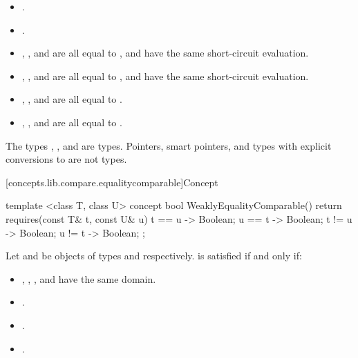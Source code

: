 \begin{itemize}
\item {}.
\item {}.
\item {}, , and
       are all equal to
      , and have the same short-circuit evaluation.
\item {}, , and
       are all equal to
      , and have the same short-circuit evaluation.
\item {}, , and
       are all equal to .
\item {}, , and
       are all equal to .
\end{itemize}

\pnum \enterexample The types , , and
 are  types.
Pointers, smart pointers, and types with explicit conversions to  are
not  types.\exitexample

[concepts.lib.compare.equalitycomparable]{Concept }

%
\begin{itemdecl}
template <class T, class U>
concept bool WeaklyEqualityComparable() {
  return requires(const T& t, const U& u) {
    { t == u } -> Boolean;
    { u == t } -> Boolean;
    { t != u } -> Boolean;
    { u != t } -> Boolean;
  };
}
\end{itemdecl}

\begin{itemdescr}
\pnum
Let  and  be objects of types  and  respectively.
 is satisfied if and only if:
\begin{itemize}
\item {}, , , and 
      have the same domain.
\item {}.
\item {}.
\item {}.
\end{itemize}
\end{itemdescr}

